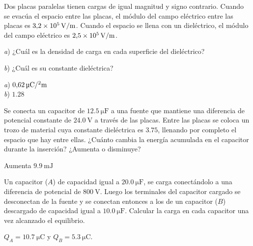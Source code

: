 %
\begin{Exercise}
  Dos placas paralelas tienen cargas de igual magnitud y signo contrario. Cuando se evacúa el espacio entre las placas, el módulo del campo eléctrico entre las placas es $\SI{3.2E5}{\volt/\metre}$. Cuando el espacio se llena con un dieléctrico, el módulo del campo eléctrico es $\SI{2.5E5}{\volt/\metre}$.\par
  \textit{a}) ¿Cuál es la densidad de carga en cada superficie del dieléctrico?\par
  \textit{b}) ¿Cuál es su constante dieléctrica?
\end{Exercise}
\begin{Answer}
    \begin{minipage}[t]{.4\textwidth}
      \textit{a}) $\SI{0.62}{\micro\coulomb/\squared\metre}$\\ \textit{b}) $1.28$
    \end{minipage}
\end{Answer}
%
\begin{Exercise}
  Se conecta un capacitor de $\SI{12.5}{\micro\farad}$ a una fuente que mantiene una diferencia de potencial constante de $\SI{24.0}{\volt}$ a través de las placas. Entre las placas se coloca un trozo de material cuya constante dieléctrica es $3.75$, llenando por completo el espacio que hay entre ellas. ¿Cuánto cambia la energía acumulada en el capacitor durante la inserción? ¿Aumenta o disminuye?
\end{Exercise}
\begin{Answer}
    \begin{minipage}[t]{.4\textwidth}
      Aumenta $\SI{9.9}{\milli\joule}$
    \end{minipage}
\end{Answer}
%
\begin{Exercise}
  Un capacitor ($A$) de capacidad igual a $\SI{20.0}{\micro\farad}$, se carga conectándolo a una diferencia de potencial de $\SI{800}{\volt}$. Luego los terminales del capacitor cargado se desconectan de la fuente y se conectan entonces a los de un capacitor ($B$) descargado de capacidad igual a $\SI{10.0}{\micro\farad}$. Calcular la carga en cada capacitor una vez alcanzado el equilibrio.
\end{Exercise}
\begin{Answer}
    \begin{minipage}[t]{.4\textwidth}
      $Q_A = \SI{10.7}{\micro\coulomb}$ y $Q_B = \SI{5.3}{\micro\coulomb}$.
    \end{minipage}
\end{Answer}
